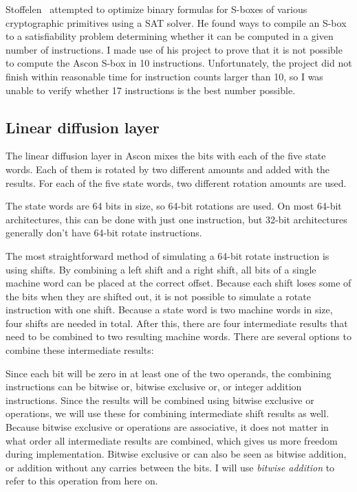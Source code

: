 Stoffelen~\cite{sat} attempted to optimize binary formulas for S-boxes of
various cryptographic primitives using a SAT solver. He found ways to compile an
S-box to a satisfiability problem determining whether it can be computed in a
given number of instructions. I made use of his project to prove that it is not
possible to compute the Ascon S-box in 10 instructions. Unfortunately, the
project did not finish within reasonable time for instruction counts larger than
10, so I was unable to verify whether 17 instructions is the best number
possible.

\subsection{Linear diffusion layer}

The linear diffusion layer in Ascon mixes the bits with each of the five state
words. Each of them is rotated by two different amounts and added with the
results. For each of the five state words, two different rotation amounts are
used.

The state words are 64 bits in size, so 64-bit rotations are used. On most
64-bit architectures, this can be done with just one instruction, but 32-bit
architectures generally don't have 64-bit rotate instructions.

The most straightforward method of simulating a 64-bit rotate instruction is
using shifts. By combining a left shift and a right shift, all bits of a single
machine word can be placed at the correct offset. Because each shift loses some
of the bits when they are shifted out, it is not possible to simulate a rotate
instruction with one shift. Because a state word is two machine words in size,
four shifts are needed in total. After this, there are four intermediate results
that need to be combined to two resulting machine words. There are several
options to combine these intermediate results:

Since each bit will be zero in at least one of the two operands, the combining
instructions can be bitwise or, bitwise exclusive or, or integer addition
instructions. Since the results will be combined using bitwise exclusive or
operations, we will use these for combining intermediate shift results as well.
Because bitwise exclusive or operations are associative, it does not matter in
what order all intermediate results are combined, which gives us more freedom
during implementation. Bitwise exclusive or can also be seen as bitwise
addition, or addition without any carries between the bits. I will use
\emph{bitwise addition} to refer to this operation from here on.

